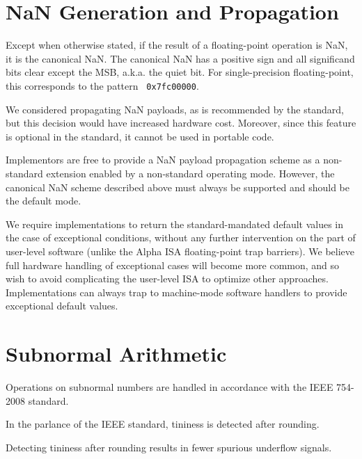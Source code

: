 \section{NaN Generation and Propagation}

Except when otherwise stated, if the result of a floating-point operation is
NaN, it is the canonical NaN.  The canonical NaN has a positive sign and all
significand bits clear except the MSB, a.k.a. the quiet bit.  For
single-precision floating-point, this corresponds to the pattern {\tt
0x7fc00000}.

\begin{commentary}
We considered propagating NaN payloads, as is recommended by the standard,
but this decision would have increased hardware cost.  Moreover, since this
feature is optional in the standard, it cannot be used in portable code.

Implementors are free to provide a NaN payload propagation scheme as
a non-standard extension enabled by a non-standard operating mode.  However, the
canonical NaN scheme described above must always be supported and should be
the default mode.
\end{commentary}

\begin{commentary}
We require implementations to return the standard-mandated default
values in the case of exceptional conditions, without any further
intervention on the part of user-level software (unlike the Alpha ISA
floating-point trap barriers).  We believe full hardware handling of
exceptional cases will become more common, and so wish to avoid
complicating the user-level ISA to optimize other approaches.
Implementations can always trap to machine-mode software handlers to
provide exceptional default values.
\end{commentary}

\section{Subnormal Arithmetic}

Operations on subnormal numbers are handled in accordance with the IEEE
754-2008 standard.

In the parlance of the IEEE standard, tininess is detected after rounding.

\begin{commentary}
Detecting tininess after rounding results in fewer spurious underflow signals.
\end{commentary}

